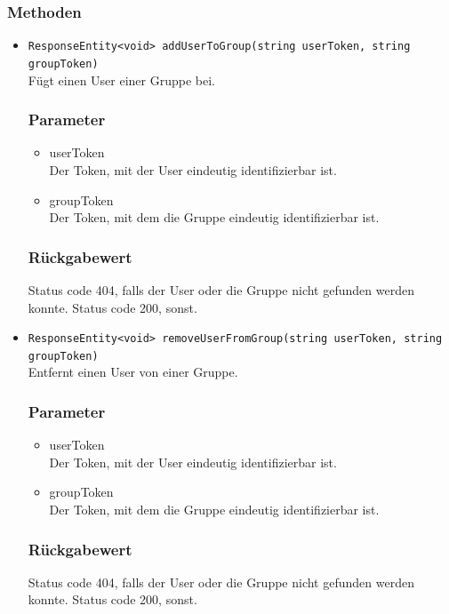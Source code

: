 \documentclass[a4paper]{scrreprt}
\begin{document}
\subsubsection*{Methoden}
\begin{addmargin}[25pt]{0pt}
\begin{itemize}

\item \texttt{ResponseEntity<void> addUserToGroup(string userToken, string groupToken)}\\
	Fügt einen User einer Gruppe bei.

	\subsubsection*{Parameter}
	\begin{itemize}
	\item userToken \\
		Der Token, mit der User eindeutig identifizierbar ist.
	\item groupToken \\
		Der Token, mit dem die Gruppe eindeutig identifizierbar ist.
	\end{itemize}

	\subsubsection*{Rückgabewert}
	Status code 404, falls der User oder die Gruppe nicht gefunden werden konnte.
	Status code 200, sonst.

\item \texttt{ResponseEntity<void> removeUserFromGroup(string userToken, string groupToken)}\\
	Entfernt einen User von einer Gruppe.

	\subsubsection*{Parameter}
	\begin{itemize}
	\item userToken \\
		Der Token, mit der User eindeutig identifizierbar ist.
	\item groupToken \\
		Der Token, mit dem die Gruppe eindeutig identifizierbar ist.
	\end{itemize}

	\subsubsection*{Rückgabewert}
	Status code 404, falls der User oder die Gruppe nicht gefunden werden konnte.
	Status code 200, sonst.
\end{itemize}
\end{addmargin}	
\end{document}
